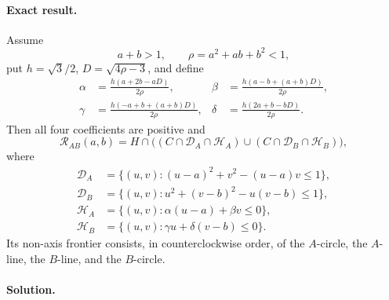 \paragraph{Exact result.}

\begin{theorem}
\label{thm:strict-ab-union}
Assume
\[
 a+b>1,\qquad \rho=a^2+ab+b^2<1,
\]
put $h=\sqrt3/2$, $D=\sqrt{4\rho-3}$, and define
\begin{align*}
 \alpha&=\frac{h(a+2b-aD)}{2\rho},&
 \beta&=\frac{h(a-b+(a+b)D)}{2\rho},\\
 \gamma&=\frac{h(-a+b+(a+b)D)}{2\rho},&
 \delta&=\frac{h(2a+b-bD)}{2\rho}.
\end{align*}
Then all four coefficients are positive and
\begin{equation}
 \mathcal R_{AB}(a,b)=H\cap\bigl(
 (C\cap\mathcal D_A\cap\mathcal H_A)
 \cup(C\cap\mathcal D_B\cap\mathcal H_B)\bigr),
 \label{eq:strict-ab-identity}
\end{equation}
where
\begin{align*}
 \mathcal D_A&=\{(u,v):(u-a)^2+v^2-(u-a)v\le1\},\\
 \mathcal D_B&=\{(u,v):u^2+(v-b)^2-u(v-b)\le1\},\\
 \mathcal H_A&=\{(u,v):\alpha(u-a)+\beta v\le0\},\\
 \mathcal H_B&=\{(u,v):\gamma u+\delta(v-b)\le0\}.
\end{align*}
Its non-axis frontier consists, in counterclockwise order, of the
$A$-circle, the $A$-line, the $B$-line, and the $B$-circle.
\end{theorem}

\paragraph{Solution.}



